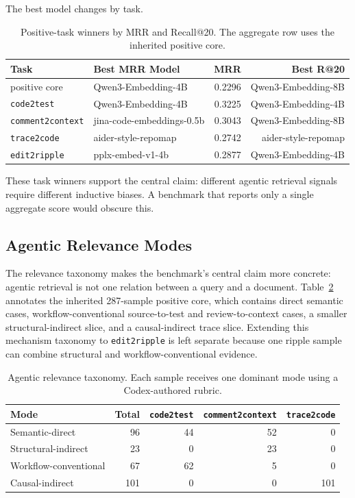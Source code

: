 \documentclass[11pt]{article}
\newcommand{\code}[1]{\texttt{#1}}
\begin{document}
The best model changes by task.

\begin{table}[t]
\centering
\caption{Positive-task winners by MRR and Recall@20. The aggregate row uses the inherited positive core.}
\label{tab:task-winners}
\begin{tabular}{llrr}
\toprule
Task & Best MRR Model & MRR & Best R@20 \\
\midrule
positive core & Qwen3-Embedding-4B & 0.2296 & Qwen3-Embedding-8B \\
\code{code2test} & Qwen3-Embedding-4B & 0.3225 & Qwen3-Embedding-4B \\
\code{comment2context} & jina-code-embeddings-0.5b & 0.3043 & Qwen3-Embedding-8B \\
\code{trace2code} & aider-style-repomap & 0.2742 & aider-style-repomap \\
\code{edit2ripple} & pplx-embed-v1-4b & 0.2877 & Qwen3-Embedding-4B \\
\bottomrule
\end{tabular}
\end{table}

These task winners support the central claim: different agentic retrieval signals require different inductive biases. A benchmark that reports only a single aggregate score would obscure this.

\subsection{Agentic Relevance Modes}

The relevance taxonomy makes the benchmark's central claim more concrete: agentic retrieval is not one relation between a query and a document. Table~\ref{tab:relevance-taxonomy} annotates the inherited 287-sample positive core, which contains direct semantic cases, workflow-conventional source-to-test and review-to-context cases, a smaller structural-indirect slice, and a causal-indirect trace slice. Extending this mechanism taxonomy to \code{edit2ripple} is left separate because one ripple sample can combine structural and workflow-conventional evidence.

\begin{table}[t]
\centering
\caption{Agentic relevance taxonomy. Each sample receives one dominant mode using a Codex-authored rubric.}
\label{tab:relevance-taxonomy}
\begin{tabular}{lrrrr}
\toprule
Mode & Total & \code{code2test} & \code{comment2context} & \code{trace2code} \\
\midrule
Semantic-direct & 96 & 44 & 52 & 0 \\
Structural-indirect & 23 & 0 & 23 & 0 \\
Workflow-conventional & 67 & 62 & 5 & 0 \\
Causal-indirect & 101 & 0 & 0 & 101 \\
\bottomrule
\end{tabular}
\end{table}
\end{document}

